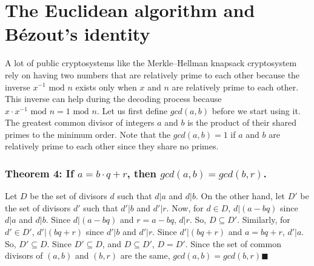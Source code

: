 \documentclass[manuscript,screen,review,nonacm]{acmart}
\begin{document}
{\section{The Euclidean algorithm and Bézout’s identity}
A lot of public cryptosystems like the Merkle–Hellman knapsack cryptosystem rely on having two numbers that are relatively prime to each other because the inverse $x^{-1}\text{ mod } n$ exists only when $x$ and $n$ are relatively prime to each other. This inverse can help during the decoding process because $x\cdot x^{-1} \text{ mod } n = 1 \text{ mod } n$.\newline
Let us first define $gcd(a,b)$ before we start using it. The greatest common divisor of integers $a$ and $b$ is the product of their shared primes to the minimum order. Note that the $gcd(a,b) =1$ if $a$ and $b$ are relatively prime to each other since they share no primes.

\subsubsection*{Theorem 4: If $a = b\cdot q + r$, then $gcd(a,b) = gcd(b,r)$.\newline}
Let $D$ be the set of divisors $d$ such that $d|a$ and $d|b$. On the other hand, let $D' $ be the set of divisors $d' $ such that $d' |b$ and $d' |r$.
Now, for $d \in D$, $d|(a-bq)$ since $d|a$ and $d|b$. Since $d|(a-bq)$ and $r=a-bq$, $d|r$. So, $D \subseteq D'$.\newline
Similarly, for $d' \in D'$, $d'|(bq+r)$ since $d'|b$ and $d'|r$. Since $d'|(bq+r)$ and $a=bq+r$, $d'|a$. So, $D' \subseteq D$.\newline
Since $D' \subseteq D$, and $D \subseteq D'$, $D=D'$. Since the set of common divisors of $(a,b)$ and $(b,r)$ are the same, $gcd(a,b) = gcd(b,r)$$\blacksquare$

}
\end{document}
